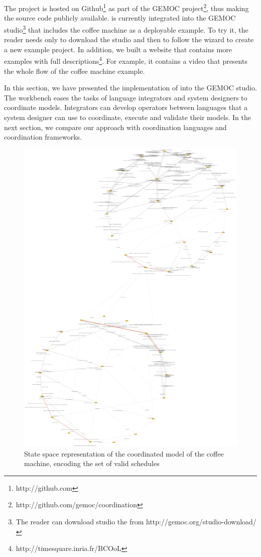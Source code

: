 The project \bcool is hosted on Github\footnote{http://github.com} as part of the GEMOC project\footnote{http://github.com/gemoc/coordination}, thus making the source code publicly available. \bcool is currently integrated into the GEMOC studio\footnote{The reader can download studio the from http://gemoc.org/studio-download/} that includes the coffee machine as a deployable example. To try it, the reader needs only to download the studio and then to follow the wizard to create a new example project. In addition, we built a website that contains more examples with full descriptions\footnote{http://timesquare.inria.fr/BCOoL}. For example, it contains a video that presents the whole flow of the coffee machine example.

In this section, we have presented the implementation of \bcool into the GEMOC studio. The workbench eases the tasks of language integrators and system designers to coordinate models. Integrators can develop operators between languages that a system designer can use to coordinate, execute and validate their models. In the next section, we compare our approach with coordination languages and coordination frameworks.  

\begin{figure}[]
	\begin{center}
		\includegraphics[width=.8\textwidth]{bcool/figs/statespace}
		\caption{State space representation of the coordinated model of the coffee machine, encoding the set of valid schedules}
		\label{fig:statespace}
	\end{center}
\end{figure}

